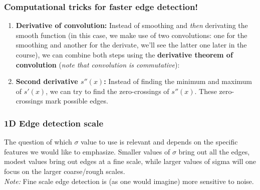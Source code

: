 \documentclass[a4paper,11pt]{article}
\begin{document}
\subsubsection{Computational tricks for faster edge detection!}
\begin{enumerate}
	\item \textbf{Derivative of convolution:} Instead of smoothing and \textit{then} derivating the smooth function (in this case, we make use of two convolutions: one for the smoothing and another for the derivate, we'll see the latter one later in the course), we can combine both steps using the \textbf{derivative theorem of convolution} (\emph{note that convolution is commutative}):
	\begin{center}
\end{center}
	\item \textbf{Second derivative $s''(x)$:} Instead of finding the minimum and maximum of $s'(x)$, we can try to find the zero-crossings of $s''(x)$. These zero-crossings mark possible edges.
\end{enumerate}
\subsubsection{1D Edge detection scale}
The question of which $\sigma$ value to use is relevant and depends on the specific features we would like to emphasize. Smaller values of $\sigma$ bring out all the edges, modest values bring out edges at a fine scale, while larger values of sigma will one focus on the larger coarse/rough scales. \\
\emph{Note:} Fine scale edge detection is (as one would imagine) more sensitive to noise. 
\end{document}
